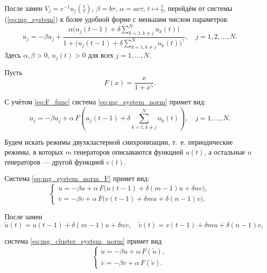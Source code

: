 После замен $V_j = c^{-1}u_j(\frac{t}{\tau})$, $\beta = b\tau$, $\alpha=ac\tau$, $t \mapsto \frac{t}{\tau}$,
перейдём от системы (\ref{eq:mg_system}) к более удобной форме с меньшим числом параметров:
%
\begin{equation}
	\label{eq:mg_system_norm}
	\dot{u}_j=-\beta u_j+\frac{\alpha\big(u_j(t - 1) + \delta\sum_{k = 1, k\neq j}^{N}u_{k}(t)\big)}{1+\big(u_j(t - 1) + \delta\sum_{k = 1, k \neq j}^{N}u_{k}(t)\big)^\gamma}, \quad j = 1, 2, \ldots, N.
\end{equation}
%
Здесь $\alpha, \beta > 0$, $u_j(t) > 0$ для всех $j = 1, \ldots, N$.

Пусть
%
\begin{equation}
	\label{eq:F_func}
	F(x) = \dfrac{x}{1 + x^\gamma}.
\end{equation}

С учётом \eqref{eq:F_func} система \eqref{eq:mg_system_norm} примет вид:
%
\begin{equation}
	\label{eq:mg_system_norm_F}
	\dot{u_j} = -\beta u_j + \alpha\,F\left(u_j(t - 1) + \delta \sum_{k = 1, k\neq j}^{N}u_{k}(t)\right), \quad j = 1, \ldots, N.
\end{equation}

Будем искать режимы двухкластерной синхронизации, т.~е. периодические режимы, в которых $m$ генераторов описываются функцией $u(t)$, а остальные $n$ генераторов --- другой функцией $v(t)$.

Система \eqref{eq:mg_system_norm_F} примет вид:
%
\begin{equation}
	\label{eq:mg_cluster_system_norm}
	\begin{cases}
		\dot{u} = -\beta u + \alpha \, F \big(u(t - 1) + \delta (m - 1) u + \delta n v\big),\\
		\dot{v} = -\beta v + \alpha  \, F \big(v(t - 1) + \delta m u + \delta (n - 1) v\big).
	\end{cases}
\end{equation}

После замен
\begin{equation}
	\label{eq:tilde_change}
	\tilde{u}(t) = u(t - 1) + \delta (m - 1) u + \delta n v, \quad \tilde{v}(t) = v(t - 1) + \delta m u + \delta (n - 1) v,
\end{equation}

система \eqref{eq:mg_cluster_system_norm} примет вид
%
\begin{equation}
	\label{eq:mg_cluster_system_pre_tilde}
	\begin{cases}
		\dot{u} = -\beta u + \alpha \, F(\tilde{u}),\\
		\dot{v} = -\beta v + \alpha \, F(\tilde{v}).
	\end{cases}
\end{equation}


